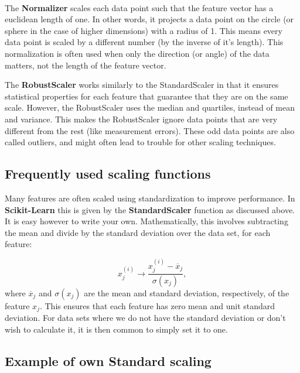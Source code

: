 \documentclass[%
oneside,                 %
final,                   %
10pt]{article}
\begin{document}
\paragraph{}
The \textbf{Normalizer} scales each data
point such that the feature vector has a euclidean length of one. In other words, it
projects a data point on the circle (or sphere in the case of higher dimensions) with a
radius of 1. This means every data point is scaled by a different number (by the
inverse of it’s length).
This normalization is often used when only the direction (or angle) of the data matters,
not the length of the feature vector.

The \textbf{RobustScaler} works similarly to the StandardScaler in that it
ensures statistical properties for each feature that guarantee that
they are on the same scale. However, the RobustScaler uses the median
and quartiles, instead of mean and variance. This makes the
RobustScaler ignore data points that are very different from the rest
(like measurement errors). These odd data points are also called
outliers, and might often lead to trouble for other scaling
techniques.



\subsection{Frequently used scaling functions}

Many features are often scaled using standardization to improve performance. In \textbf{Scikit-Learn} this is given by the \textbf{StandardScaler} function as discussed above. It is easy however to write your own. 
Mathematically, this involves subtracting the mean and divide by the standard deviation over the data set, for each feature:

\[
    x_j^{(i)} \rightarrow \frac{x_j^{(i)} - \overline{x}_j}{\sigma(x_j)},
\]
where $\overline{x}_j$ and $\sigma(x_j)$ are the mean and standard deviation, respectively,  of the feature $x_j$.
This ensures that each feature has zero mean and unit standard deviation.  For data sets where  we do not have the standard deviation or don't wish to calculate it,  it is then common to simply set it to one.

\subsection{Example of own Standard scaling}
\end{document}
